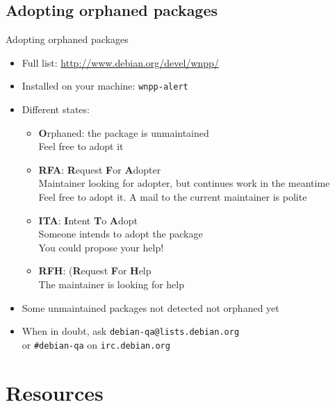 \documentclass[10pt,final]{beamer}
\begin{document}
\subsection{Adopting orphaned packages}
\begin{frame}{Adopting orphaned packages}
  \begin{itemize}
  \item Full list: \url{http://www.debian.org/devel/wnpp/}
    \hbr
  \item Installed on your machine: \texttt{wnpp-alert}
    \hbr
  \item Different states:
    \begin{itemize}
    \item \textbf{O}rphaned: the package is unmaintained\\
      Feel free to adopt it
    \item \textbf{RFA}: \textbf{R}equest \textbf{F}or \textbf{A}dopter\\
      Maintainer looking for adopter, but continues work in the meantime\\
      Feel free to adopt it. A mail to the current maintainer is polite
    \item \textbf{ITA}: \textbf{I}ntent \textbf{T}o \textbf{A}dopt\\
      Someone intends to adopt the package\\
      You could propose your help!
    \item \textbf{RFH}: (\textbf{R}equest \textbf{F}or \textbf{H}elp\\
      The maintainer is looking for help
    \end{itemize}
    \hbr
  \item Some unmaintained packages not detected \arr not orphaned yet
    \hbr
  \item When in doubt, ask \texttt{debian-qa@lists.debian.org} \\
    or \texttt{\#debian-qa} on \texttt{irc.debian.org}
    
  \end{itemize}
\end{frame}

\section{Resources}
\end{document}
